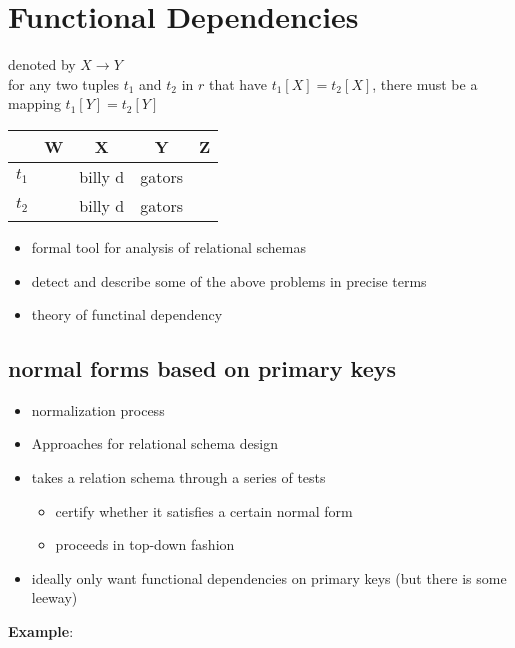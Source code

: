 \documentclass[12pt]{article}
\begin{document}
\section{Functional Dependencies}
denoted by $X \rightarrow Y$\\
for any two tuples $t_1$ and $t_2$ in $r$ that have $t_1[X] = t_2[X]$, there
must be a mapping $t_1[Y] = t_2[Y]$\\

\begin{tabular}{c|c|c|c|c}
  & W & X & Y & Z\\
  \hline
  $t_1$ &  & billy d & gators & \\
  \hline
  $t_2$ & & billy d & gators & \\
  \hline
\end{tabular}

\begin{itemize}
  \item {formal tool for analysis of relational schemas}
  \item {detect and describe some of the above problems in precise terms}
  \item {theory of functinal dependency}
\end{itemize}

\subsection{normal forms based on primary keys}
\begin{itemize}
  \item {normalization process}
  \item {Approaches for relational schema design}
\end{itemize}
\begin{itemize}
  \item {
      takes a relation schema through a series of tests
      \begin{itemize}
        \item {certify whether it satisfies a certain normal form}
        \item {proceeds in top-down fashion}
      \end{itemize}
    }
  \item {ideally only want functional dependencies on primary keys (but there
      is some leeway)}
\end{itemize}

\textbf{Example}:\\
\end{document}
